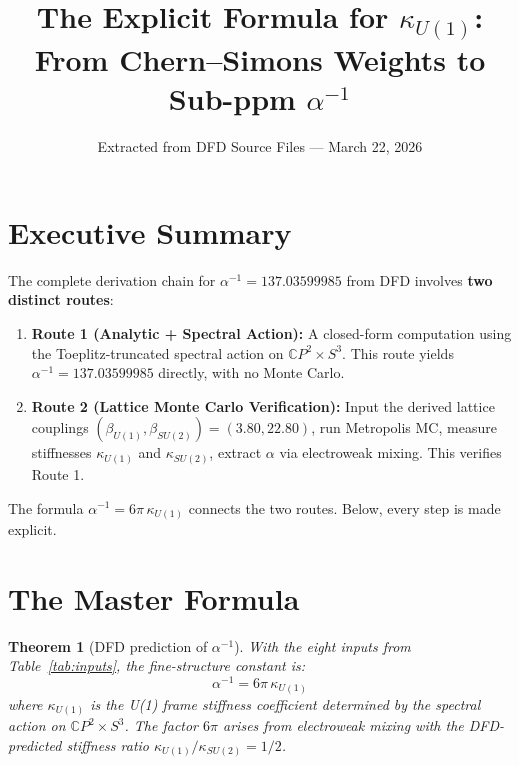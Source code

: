 \documentclass[11pt,a4paper]{article}
\title{The Explicit Formula for $\kappa_{U(1)}$:\\
From Chern--Simons Weights to Sub-ppm $\alpha^{-1}$}
\author{Extracted from DFD Source Files --- March 22, 2026}
\date{}
\newtheorem{theorem}{Theorem}
\theoremstyle{definition}
\begin{document}
\maketitle

\section{Executive Summary}

The complete derivation chain for $\alpha^{-1} = 137.03599985$ from DFD
involves \textbf{two distinct routes}:

\begin{enumerate}
\item \textbf{Route 1 (Analytic + Spectral Action):} A closed-form computation
using the Toeplitz-truncated spectral action on $\mathbb{C}P^2 \times S^3$.
This route yields $\alpha^{-1} = 137.03599985$ directly, with no Monte Carlo.

\item \textbf{Route 2 (Lattice Monte Carlo Verification):} Input the derived
lattice couplings $(\beta_{U(1)}, \beta_{SU(2)}) = (3.80, 22.80)$, run
Metropolis MC, measure stiffnesses $\kappa_{U(1)}$ and $\kappa_{SU(2)}$,
extract $\alpha$ via electroweak mixing. This verifies Route 1.
\end{enumerate}

\noindent The formula $\alpha^{-1} = 6\pi\,\kappa_{U(1)}$ connects the two routes.
Below, every step is made explicit.

\section{The Master Formula}

\begin{theorem}[DFD prediction of $\alpha^{-1}$]
\label{thm:master}
With the eight inputs from Table~\ref{tab:inputs}, the fine-structure constant is:
\begin{equation}\label{eq:master}
\boxed{\alpha^{-1} = 6\pi\,\kappa_{U(1)}}
\end{equation}
where $\kappa_{U(1)}$ is the U(1) frame stiffness coefficient determined by the
spectral action on $\mathbb{C}P^2 \times S^3$.  The factor $6\pi$ arises from
electroweak mixing with the DFD-predicted stiffness ratio
$\kappa_{U(1)}/\kappa_{SU(2)} = 1/2$.
\end{theorem}
\end{document}
